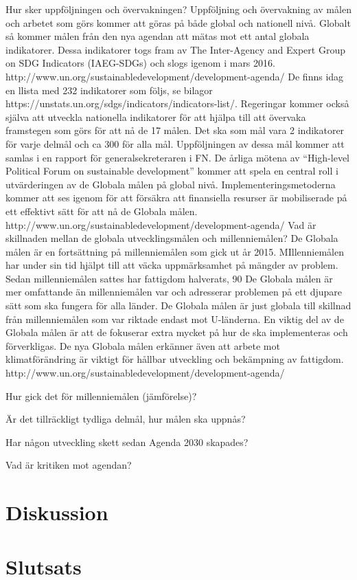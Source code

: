 \documentclass{report}
\begin{document}
Hur sker uppföljningen och övervakningen?
Uppföljning och övervakning av målen och arbetet som görs kommer att göras på både global och nationell nivå. Globalt så kommer målen från den nya agendan att mätas mot ett antal globala indikatorer. Dessa indikatorer togs fram av The Inter-Agency and Expert Group on SDG Indicators (IAEG-SDGs) och slogs igenom i mars 2016. http://www.un.org/sustainabledevelopment/development-agenda/
De finns idag en llista med 232 indikatorer som följs, se bilagor https://unstats.un.org/sdgs/indicators/indicators-list/.
Regeringar kommer också själva att utveckla nationella indikatorer för att hjälpa till att övervaka framstegen som görs för att nå de 17 målen. Det ska som mål vara 2 indikatorer för varje delmål och ca 300 för alla mål. Uppföljningen av dessa mål kommer att samlas i en rapport för generalsekreteraren i FN. De årliga mötena av  “High-level Political Forum on sustainable development” kommer att spela en central roll i utvärderingen av de Globala målen på global nivå. Implementeringsmetoderna kommer att ses igenom för att försäkra att finansiella resurser är mobiliserade på ett effektivt sätt för att nå de Globala målen.  http://www.un.org/sustainabledevelopment/development-agenda/
Vad är skillnaden mellan de globala utvecklingsmålen och millenniemålen?
De Globala målen är en fortsättning på millenniemålen som gick ut år 2015. MIllenniemålen har under sin tid hjälpt till att väcka uppmärksamhet på mängder av problem. Sedan millenniemålen sattes har  fattigdom halverats, 90%
De Globala målen är mer omfattande än millenniemålen var och adresserar problemen på ett djupare sätt som ska fungera för alla länder. De Globala målen är just globala till skillnad från millenniemålen som var riktade endast mot U-länderna. En viktig del av de Globala målen är att de fokuserar extra mycket på hur de ska implementeras och förverkligas. De nya Globala målen erkänner även att arbete mot klimatförändring är viktigt för hållbar utveckling och bekämpning av fattigdom. http://www.un.org/sustainabledevelopment/development-agenda/

Hur gick det för millenniemålen (jämförelse)? 

Är det tillräckligt tydliga delmål, hur målen ska uppnås?

Har någon utveckling skett sedan Agenda 2030 skapades?

Vad är kritiken mot agendan? 

\newpage
\section{Diskussion}

\newpage
\section{Slutsats}

 
\end{document}
